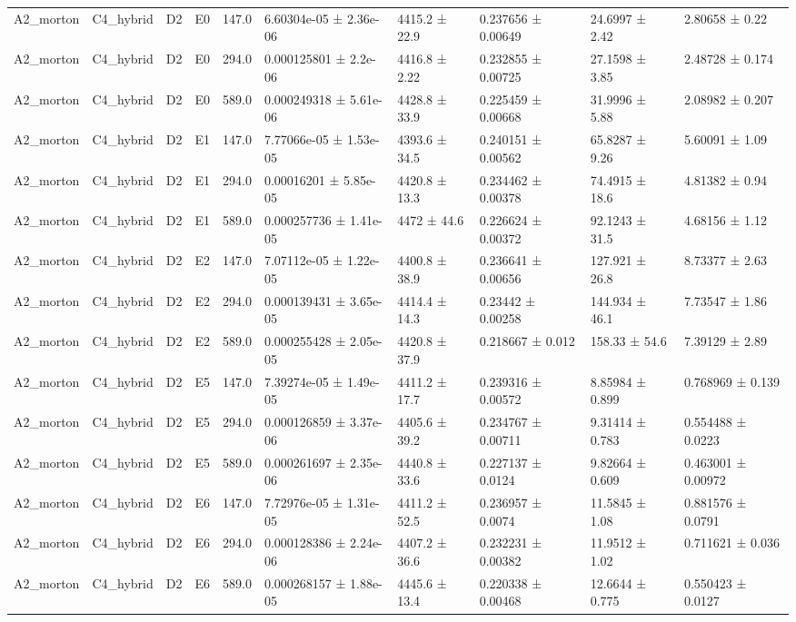 \begin{table}
\begin{tabular}{llllllllll}
A2\_morton & C4\_hybrid & D2 & E0 & 147.0 & 6.60304e-05 ± 2.36e-06 & 4415.2 ± 22.9 & 0.237656 ± 0.00649 & 24.6997 ± 2.42 & 2.80658 ± 0.22 \\
A2\_morton & C4\_hybrid & D2 & E0 & 294.0 & 0.000125801 ± 2.2e-06 & 4416.8 ± 2.22 & 0.232855 ± 0.00725 & 27.1598 ± 3.85 & 2.48728 ± 0.174 \\
A2\_morton & C4\_hybrid & D2 & E0 & 589.0 & 0.000249318 ± 5.61e-06 & 4428.8 ± 33.9 & 0.225459 ± 0.00668 & 31.9996 ± 5.88 & 2.08982 ± 0.207 \\
A2\_morton & C4\_hybrid & D2 & E1 & 147.0 & 7.77066e-05 ± 1.53e-05 & 4393.6 ± 34.5 & 0.240151 ± 0.00562 & 65.8287 ± 9.26 & 5.60091 ± 1.09 \\
A2\_morton & C4\_hybrid & D2 & E1 & 294.0 & 0.00016201 ± 5.85e-05 & 4420.8 ± 13.3 & 0.234462 ± 0.00378 & 74.4915 ± 18.6 & 4.81382 ± 0.94 \\
A2\_morton & C4\_hybrid & D2 & E1 & 589.0 & 0.000257736 ± 1.41e-05 & 4472 ± 44.6 & 0.226624 ± 0.00372 & 92.1243 ± 31.5 & 4.68156 ± 1.12 \\
A2\_morton & C4\_hybrid & D2 & E2 & 147.0 & 7.07112e-05 ± 1.22e-05 & 4400.8 ± 38.9 & 0.236641 ± 0.00656 & 127.921 ± 26.8 & 8.73377 ± 2.63 \\
A2\_morton & C4\_hybrid & D2 & E2 & 294.0 & 0.000139431 ± 3.65e-05 & 4414.4 ± 14.3 & 0.23442 ± 0.00258 & 144.934 ± 46.1 & 7.73547 ± 1.86 \\
A2\_morton & C4\_hybrid & D2 & E2 & 589.0 & 0.000255428 ± 2.05e-05 & 4420.8 ± 37.9 & 0.218667 ± 0.012 & 158.33 ± 54.6 & 7.39129 ± 2.89 \\
A2\_morton & C4\_hybrid & D2 & E5 & 147.0 & 7.39274e-05 ± 1.49e-05 & 4411.2 ± 17.7 & 0.239316 ± 0.00572 & 8.85984 ± 0.899 & 0.768969 ± 0.139 \\
A2\_morton & C4\_hybrid & D2 & E5 & 294.0 & 0.000126859 ± 3.37e-06 & 4405.6 ± 39.2 & 0.234767 ± 0.00711 & 9.31414 ± 0.783 & 0.554488 ± 0.0223 \\
A2\_morton & C4\_hybrid & D2 & E5 & 589.0 & 0.000261697 ± 2.35e-06 & 4440.8 ± 33.6 & 0.227137 ± 0.0124 & 9.82664 ± 0.609 & 0.463001 ± 0.00972 \\
A2\_morton & C4\_hybrid & D2 & E6 & 147.0 & 7.72976e-05 ± 1.31e-05 & 4411.2 ± 52.5 & 0.236957 ± 0.0074 & 11.5845 ± 1.08 & 0.881576 ± 0.0791 \\
A2\_morton & C4\_hybrid & D2 & E6 & 294.0 & 0.000128386 ± 2.24e-06 & 4407.2 ± 36.6 & 0.232231 ± 0.00382 & 11.9512 ± 1.02 & 0.711621 ± 0.036 \\
A2\_morton & C4\_hybrid & D2 & E6 & 589.0 & 0.000268157 ± 1.88e-05 & 4445.6 ± 13.4 & 0.220338 ± 0.00468 & 12.6644 ± 0.775 & 0.550423 ± 0.0127 \\

\end{tabular}
\end{table}
